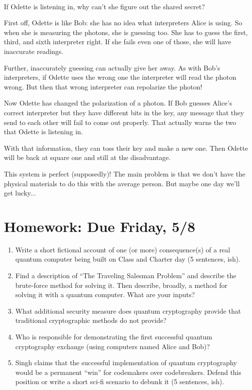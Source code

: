 \\
\item If Odette is listening in, why can't she figure out the shared secret?
\item First off, Odette is like Bob: she has no idea what interpreters Alice is using. So when she is measuring the photons, she is guessing too. She has to guess the first, third, and sixth interpreter right. If she fails even one of those, she will have inaccurate readings.
\item Further, inaccurately guessing can actually give her away. As with Bob's interpreters, if Odette uses the wrong one the interpreter will read the photon wrong. But then that wrong interpreter can repolarize the photon!
\item Now Odette has changed the polarization of a photon. If Bob guesses Alice's correct interpreter but they have different bits in the key, any message that they send to each other will fail to come out properly. That actually warns the two that Odette is listening in.
\item With that information, they can toss their key and make a new one. Then Odette will be back at square one and still at the disadvantage.

\item This system is perfect (supposedly)! The main problem is that we don't have the physical materials to do this with the average person. But maybe one day we'll get lucky...

\pagebreak
\section{Homework: Due Friday, 5/8}
\begin{enumerate}
\item Write a short fictional account of one (or more) consequence(s) of a real quantum computer being built on Class and Charter day (5 sentences, ish).
\item Find a description of ``The Traveling Salesman Problem'' and describe the brute-force method for solving it.  Then describe, broadly, a method for solving it with a quantum computer.  What are your inputs?
\item What additional security measure does quantum cryptography provide that traditional cryptographic methods do not provide?
\item Who is responsible for demonstrating the first successful quantum cryptography exchange (using computers named Alice and Bob)?
\item Singh claims that the successful implementation of quantum cryptography would be a permanent ``win'' for codemakers over codebreakers.  Defend this position or write a short sci-fi scenario to debunk it (5 sentences, ish).
\end{enumerate}